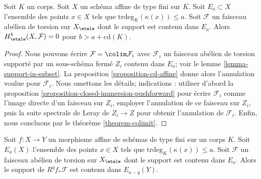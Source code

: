 \begin{lemma}
\label{lemma-interlude-II}
Soit $K$ un corps. Soit $X$ un schéma affine de type fini sur $K$.
Soit $E_a \subset X$ l'ensemble des points
$x \in X$ tels que $\text{trdeg}_K(\kappa(x)) \leq a$.
Soit $\mathcal{F}$ un faisceau abélien de torsion sur $X_\etale$
dont le support est contenu dans $E_a$. Alors
$H^b_\etale(X, \mathcal{F}) = 0$ pour $b > a + \text{cd}(K)$.
\end{lemma}

\begin{proof}
Nous pouvons écrire $\mathcal{F} = \colim \mathcal{F}_i$
avec $\mathcal{F}_i$ un faisceau abélien de torsion
supporté par un sous-schéma fermé $Z_i$ contenu dans $E_a$; voir le
lemme \ref{lemma-support-in-subset}.
La proposition \ref{proposition-cd-affine} donne alors
l'annulation voulue pour $\mathcal{F}_i$. Nous omettons les détails;
indications : utiliser d'abord la proposition \ref{proposition-closed-immersion-pushforward}
pour écrire $\mathcal{F}_i$ comme l'image directe d'un faisceau sur $Z_i$,
employer l'annulation de ce faisceau sur $Z_i$, puis la
suite spectrale de Leray de $Z_i \to Z$ pour obtenir l'annulation
de $\mathcal{F}_i$. Enfin, nous
concluons par le théorème \ref{theorem-colimit}.
\end{proof}

\begin{lemma}
\label{lemma-interlude-I}
Soit $f : X \to Y$ un morphisme affine de schémas de type
fini sur un corps $K$. Soit $E_a(X)$ l'ensemble des points $x \in X$
tels que $\text{trdeg}_K(\kappa(x)) \leq a$.
Soit $\mathcal{F}$ un faisceau abélien de torsion sur $X_\etale$
dont le support est contenu dans $E_a$. Alors
le support de $R^qf_*\mathcal{F}$ est contenu dans
$E_{a - q}(Y)$.
\end{lemma}

